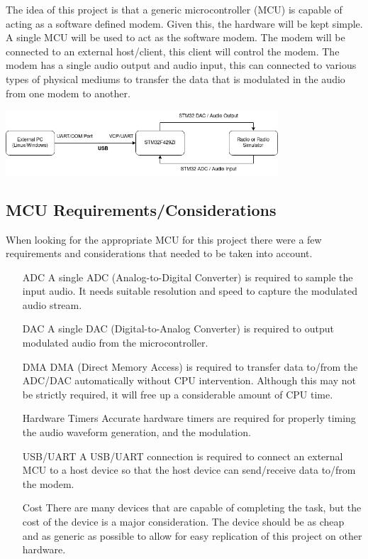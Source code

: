 \documentclass{journal}
\begin{document}
The idea of this project is that a generic microcontroller (MCU) is capable of acting as a software defined modem. Given this, the hardware will be kept simple. A single MCU will be used to act as the software modem. The modem will be connected to an external host/client, this client will control the modem. The modem has a single audio output and audio input, this can connected to various types of physical mediums to transfer the data that is modulated in the audio from one modem to another.

\includegraphics[width=4in]{images/hardware_outline}

\begin{center}
\subsection{MCU Requirements/Considerations}
\end{center}

When looking for the appropriate MCU for this project there were a few requirements and considerations that needed to be taken into account.

\begin{itemize}
  \item[ADC] A single ADC (Analog-to-Digital Converter) is required to sample the input audio. It needs suitable resolution and speed to capture the modulated audio stream.
  \item[DAC] A single DAC (Digital-to-Analog Converter) is required to output modulated audio from the microcontroller.
  \item[DMA] DMA (Direct Memory Access) is required to transfer data to/from the ADC/DAC automatically without CPU intervention. Although this may not be strictly required, it will free up a considerable amount of CPU time.
  \item[Hardware Timers] Accurate hardware timers are required for properly timing the audio waveform generation, and the modulation.
  \item[USB/UART] A USB/UART connection is required to connect an external MCU to a host device so that the host device can send/receive data to/from the modem.
  \item[Cost] There are many devices that are capable of completing the task, but the cost of the device is a major consideration. The device should be as cheap and as generic as possible to allow for easy replication of this project on other hardware.
\end{itemize}
\end{document}
